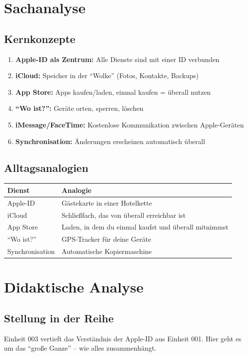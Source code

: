 \documentclass[11pt,a4paper]{article}
\begin{document}
\section{Sachanalyse}

\subsection{Kernkonzepte}
\begin{enumerate}
    \item \textbf{Apple-ID als Zentrum:} Alle Dienste sind mit einer ID verbunden
    \item \textbf{iCloud:} Speicher in der ``Wolke'' (Fotos, Kontakte, Backups)
    \item \textbf{App Store:} Apps kaufen/laden, einmal kaufen = überall nutzen
    \item \textbf{``Wo ist?'':} Geräte orten, sperren, löschen
    \item \textbf{iMessage/FaceTime:} Kostenlose Kommunikation zwischen Apple-Geräten
    \item \textbf{Synchronisation:} Änderungen erscheinen automatisch überall
\end{enumerate}

\subsection{Alltagsanalogien}
\begin{tabular}{|l|p{8cm}|}
\hline
\textbf{Dienst} & \textbf{Analogie} \\
\hline
Apple-ID & Gästekarte in einer Hotelkette \\
iCloud & Schließfach, das von überall erreichbar ist \\
App Store & Laden, in dem du einmal kaufst und überall mitnimmst \\
``Wo ist?'' & GPS-Tracker für deine Geräte \\
Synchronisation & Automatische Kopiermaschine \\
\hline
\end{tabular}

\section{Didaktische Analyse}

\subsection{Stellung in der Reihe}
Einheit 003 vertieft das Verständnis der Apple-ID aus Einheit 001. Hier geht es um das ``große Ganze'' -- wie alles zusammenhängt.
\end{document}
